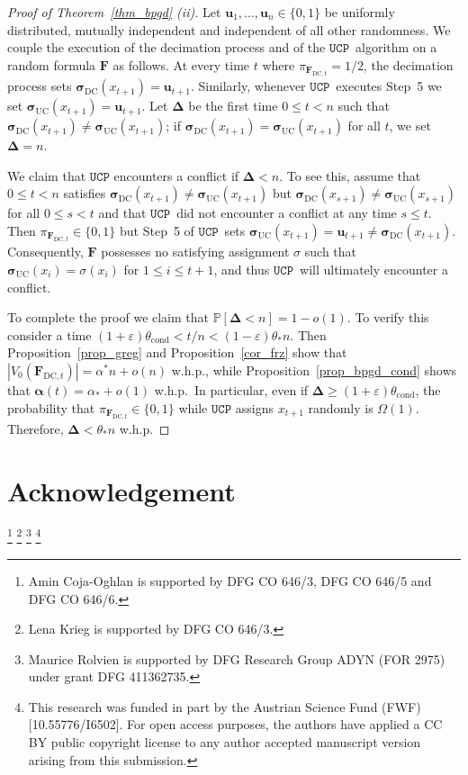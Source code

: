 \documentclass[10pt,reqno]{amsart}
\numberwithin{equation}{section}
\renewcommand{\vec}[1]{\boldsymbol{#1}}
\newcommand{\FDC}[1]{\PHI_{\mathrm{DC},{#1}}}
\newcommand{\tcond}{\theta_{\mathrm{cond}}}
\newcommand{\frz}{V_0}
\newcommand{\UCP}{\ensuremath{\mathtt{UCP}}}
\newcommand\PHI{\vec F}
\newcommand\SIGUC{\vec\sigma_{\mathrm{UC}}}
\newcommand\SIGDEC{\vec\sigma_{\mathrm{DC}}}
\newcommand\SIGDC{\SIGDEC}
\newcommand\vu{\vec u}
\newcommand\eps{\varepsilon}
\newcommand\brk[1]{\left\lbrack{#1}\right\rbrack}
\newcommand{\whp}{w.h.p.}
\newcommand\pr{\mathbb{P}}
\newcommand\Prop{Proposition}
\newcommand\Thm{Theorem}
\def\pr{{\mathbb P}}
\begin{document}
\begin{proof}[Proof of \Thm~\ref{thm_bpgd} (ii)]
	Let $\vu_1,\ldots,\vu_n\in\{0,1\}$ be uniformly distributed, mutually independent and independent of all other randomness.
	We couple the execution of the decimation process and of the \UCP\ algorithm on a random formula $\PHI$ as follows.
	At every time $t$ where $\pi_{\FDC t}=1/2$, the decimation process sets $\SIGDC(x_{t+1})=\vu_{t+1}$. 
	Similarly, whenever \UCP\ executes Step~5 we set $\SIGUC(x_{t+1})=\vu_{t+1}$.
	Let $\vec\Delta$ be the first time $0\leq t<n$ such that $\SIGDC(x_{t+1})\neq\SIGUC(x_{t+1})$; if $\SIGDC(x_{t+1})=\SIGUC(x_{t+1})$ for all $t$, we set $\vec\Delta=n$.

	We claim that $\UCP$ encounters a conflict if $\vec\Delta<n$.
	To see this, assume that $0\leq t<n$ satisfies $\SIGDC(x_{t+1})\neq\SIGUC(x_{t+1})$ but $\SIGDC(x_{s+1})\neq\SIGUC(x_{s+1})$ for all $0\leq s<t$ and that \UCP\ did not encounter a conflict at any time $s\leq t$.
	Then $\pi_{\FDC t}\in\{0,1\}$ but Step~5 of \UCP\ sets $\SIGUC(x_{t+1})=\vu_{t+1}\neq\SIGDC(x_{t+1})$.
	Consequently, $\PHI$ possesses no satisfying assignment $\sigma$ such that $\SIGUC(x_{i})=\sigma(x_i)$ for $1\leq i\leq t+1$, and thus \UCP\ will ultimately encounter a conflict.

	To complete the proof we claim that $\pr\brk{\vec\Delta<n}=1-o(1)$.
	To verify this consider a time $(1+\eps)\tcond<t/n<(1-\eps)\theta_*n$.
	Then \Prop~\ref{prop_greg} and \Prop~\ref{cor_frz} show that $|\frz(\FDC{t})|=\alpha^* n+o(n)$ \whp, while \Prop~\ref{prop_bpgd_cond} shows that $\vec\alpha(t)=\alpha_*+o(1)$ \whp\
	In particular, even if $\vec\Delta\geq(1+\eps)\tcond$, the probability that $\pi_{\FDC t}\in\{0,1\}$ while $\UCP$ assigns $x_{t+1}$ randomly is $\Omega(1)$.
	Therefore, $\vec\Delta<\theta_*n$ \whp
\end{proof}

\section*{Acknowledgement}

\thanks{Amin Coja-Oghlan is supported by DFG CO 646/3, DFG CO 646/5 and DFG CO 646/6.}
\thanks{Lena Krieg is supported by DFG CO 646/3.}
\thanks{Maurice Rolvien is supported by DFG Research Group ADYN (FOR 2975) under grant DFG 411362735.}
\thanks{This research was funded in part by the Austrian Science Fund (FWF) [10.55776/I6502]. For open access purposes, the authors have applied a CC BY public copyright license to any author accepted manuscript version arising from this submission.}



\end{document}
